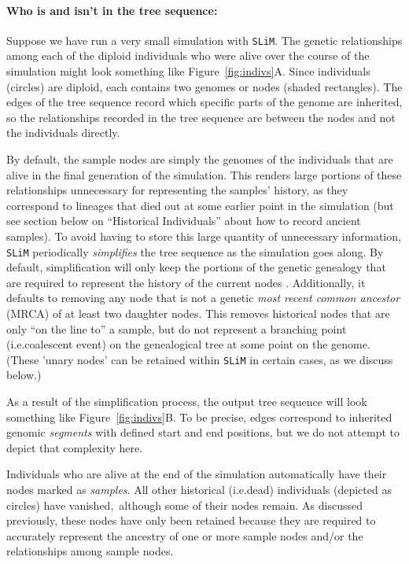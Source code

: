 \documentclass[12pt]{article}
\newcommand{\slim}[0]{\texttt{SLiM}\xspace}
\newcommand*{\ie}{i.e.\xcomma}
\begin{document}
\paragraph{Who is and isn't in the tree sequence:}
Suppose we have run a very small simulation with \slim. The genetic relationships among each of the
diploid individuals who were alive over the course of the simulation might
look something like Figure~\ref{fig:indivs}A. Since individuals (circles) are diploid, each contains
two genomes or nodes (shaded rectangles).
The edges of the tree sequence record which specific parts of the genome are inherited,
so the relationships recorded in the tree sequence are between the nodes and not the individuals directly.

By default, the sample nodes are simply the genomes of the individuals that are alive in the final generation
of the simulation. This renders large portions of these relationships unnecessary for representing the samples' history,
as they correspond to lineages that died out at some earlier point in the simulation (but see section below on
``Historical Individuals'' about how to record ancient samples).
To avoid having to
store this large quantity of unnecessary information, \slim periodically \textit{simplifies} the tree sequence
as the simulation goes along. By default, simplification will only keep the portions of the
genetic genealogy that are required to represent the history of the current nodes \citep{kelleher_efficient_2018}.
Additionally, it defaults to removing any node that is not a genetic
\textit{most recent common ancestor} (MRCA) of at least two daughter nodes. This removes historical
nodes that are only ``on the line to'' a sample, but do not represent a branching point
(\ie coalescent event) on the genealogical tree at some point on the genome.
(These 'unary nodes' can be retained within \slim in certain cases,
as we discuss below.)

As a result of the simplification process, the output tree sequence will look something like Figure~\ref{fig:indivs}B.
To be precise, edges correspond to inherited genomic \emph{segments} with defined start and end positions,
but we do not attempt to depict that complexity here.

Individuals who are alive at the end of the simulation automatically have their nodes marked as
\textit{samples}. All other historical (\ie dead) individuals (depicted as circles) have vanished,\
although some of their nodes remain. As discussed previously, these nodes have only been retained because they are required to
accurately represent the ancestry of one or more sample nodes and/or the relationships among sample nodes.
\end{document}
